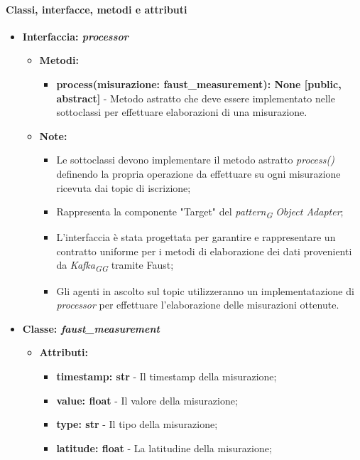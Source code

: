 \paragraph*{Classi, interfacce, metodi e attributi}
\begin{itemize}
    \item{\textbf{Interfaccia: \textit{processor}}}
    \begin{itemize}
    \item\textbf{Metodi: }
    \begin{itemize}
        \item \textbf{process(misurazione: faust\_measurement): None [public, abstract]} - Metodo astratto che deve essere implementato nelle sottoclassi per effettuare elaborazioni di una misurazione.
    \end{itemize}
    \item\textbf{Note:}
        \begin{itemize}
            \item  Le sottoclassi devono implementare il metodo astratto \textit{process()} definendo la propria operazione da effettuare su ogni misurazione ricevuta dai topic di iscrizione;
            \item Rappresenta la componente "Target" del \textit{pattern}\textsubscript{\textit{G}} \textit{Object Adapter};
            \item L'interfaccia è stata progettata per garantire e rappresentare un contratto uniforme per i metodi di elaborazione dei dati provenienti da \textit{Kafka}\textsubscript{\textit{G}}\textsubscript{\textit{G}} tramite Faust;
            \item Gli agenti in ascolto sul topic utilizzeranno un implementatazione di \textit{processor} per effettuare l'elaborazione delle misurazioni ottenute.
        \end{itemize}
    \end{itemize}
    \item{\textbf{Classe: \textit{faust\_measurement}}}
    \begin{itemize}
    \item\textbf{Attributi:}
        \begin{itemize}
        \item \textbf{timestamp: str} - Il timestamp della misurazione;
        \item \textbf{value: float} - Il valore della misurazione;
        \item \textbf{type: str} - Il tipo della misurazione;
        \item \textbf{latitude: float} - La latitudine della misurazione;

\end{itemize}
\end{itemize}
\end{itemize}
